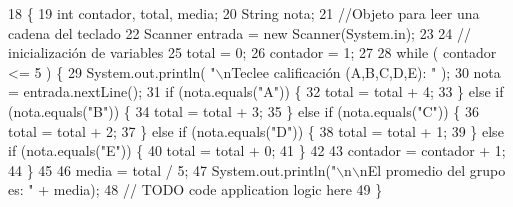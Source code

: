 \begin{DoxyCode}
18                                            \{
19         \textcolor{keywordtype}{int} contador, total, media;
20       String nota;
21        \textcolor{comment}{//Objeto para leer una cadena del teclado}
22       Scanner entrada = \textcolor{keyword}{new} Scanner(System.in);
23  
24       \textcolor{comment}{// inicialización de variables}
25       total = 0;
26       contador = 1;
27   
28        \textcolor{keywordflow}{while} ( contador <= 5 ) \{
29          System.out.println( \textcolor{stringliteral}{"\(\backslash\)nTeclee calificación (A,B,C,D,E): "} );
30          nota = entrada.nextLine();
31          \textcolor{keywordflow}{if} (nota.equals(\textcolor{stringliteral}{"A"})) \{
32                 total = total + 4;
33          \} \textcolor{keywordflow}{else} \textcolor{keywordflow}{if} (nota.equals(\textcolor{stringliteral}{"B"})) \{
34                 total = total + 3;
35          \} \textcolor{keywordflow}{else} \textcolor{keywordflow}{if} (nota.equals(\textcolor{stringliteral}{"C"})) \{
36                 total = total + 2;
37          \} \textcolor{keywordflow}{else} \textcolor{keywordflow}{if} (nota.equals(\textcolor{stringliteral}{"D"})) \{
38                 total = total + 1;
39          \} \textcolor{keywordflow}{else} \textcolor{keywordflow}{if} (nota.equals(\textcolor{stringliteral}{"E"})) \{
40                 total = total + 0;
41          \}
42  
43          contador = contador + 1;
44       \}
45   
46       media = total / 5;
47       System.out.println(\textcolor{stringliteral}{"\(\backslash\)n\(\backslash\)nEl promedio del grupo es: "} + media);
48         \textcolor{comment}{// TODO code application logic here}
49     \}
\end{DoxyCode}
